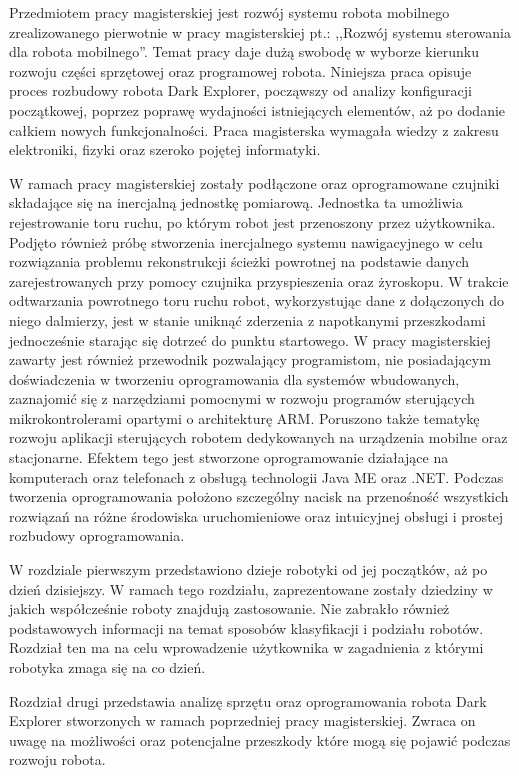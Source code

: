Przedmiotem pracy magisterskiej jest rozwój systemu robota mobilnego zrealizowanego pierwotnie w pracy magisterskiej pt.: ,,Rozwój systemu sterowania dla robota mobilnego''\cite{KmakMScThesis2009}. Temat pracy daje dużą swobodę w wyborze kierunku rozwoju części sprzętowej oraz programowej robota. Niniejsza praca opisuje proces rozbudowy robota Dark Explorer, począwszy od analizy konfiguracji początkowej, poprzez poprawę wydajności istniejących elementów, aż po dodanie całkiem nowych funkcjonalności. Praca magisterska wymagała wiedzy z zakresu elektroniki, fizyki oraz szeroko pojętej informatyki. 

W ramach pracy magisterskiej zostały podłączone oraz oprogramowane czujniki składające się na inercjalną jednostkę pomiarową. Jednostka ta umożliwia rejestrowanie toru ruchu, po którym robot jest przenoszony przez użytkownika. Podjęto również próbę stworzenia inercjalnego systemu nawigacyjnego w celu rozwiązania problemu rekonstrukcji ścieżki powrotnej na podstawie danych zarejestrowanych przy pomocy czujnika przyspieszenia oraz żyroskopu. W trakcie odtwarzania powrotnego toru ruchu robot, wykorzystując dane z dołączonych do niego dalmierzy, jest w stanie uniknąć zderzenia z napotkanymi przeszkodami jednocześnie starając się dotrzeć do punktu startowego. W pracy magisterskiej zawarty jest również przewodnik pozwalający programistom, nie posiadającym doświadczenia w tworzeniu oprogramowania dla systemów wbudowanych, zaznajomić się z narzędziami pomocnymi w rozwoju programów sterujących mikrokontrolerami opartymi o architekturę ARM. Poruszono także tematykę rozwoju aplikacji sterujących robotem dedykowanych na urządzenia mobilne oraz stacjonarne. Efektem tego jest stworzone oprogramowanie działające na komputerach oraz telefonach z obsługą technologii Java ME oraz .NET. Podczas tworzenia oprogramowania położono szczególny nacisk na przenośność wszystkich rozwiązań na różne środowiska uruchomieniowe oraz intuicyjnej obsługi i prostej rozbudowy oprogramowania.

W rozdziale pierwszym przedstawiono dzieje robotyki od jej początków, aż po dzień dzisiejszy. W ramach tego rozdziału, zaprezentowane zostały dziedziny w jakich współcześnie roboty znajdują zastosowanie. Nie zabrakło również podstawowych informacji na temat sposobów klasyfikacji i podziału robotów. Rozdział ten ma na celu wprowadzenie użytkownika w zagadnienia z którymi robotyka zmaga się na co dzień.

Rozdział drugi przedstawia analizę sprzętu oraz oprogramowania robota Dark Explorer stworzonych w ramach poprzedniej pracy magisterskiej. Zwraca on uwagę na możliwości oraz potencjalne przeszkody które mogą się pojawić podczas rozwoju robota. 

